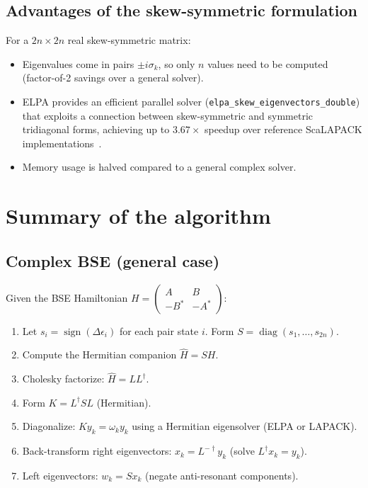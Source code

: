 \documentclass[11pt]{article}
\newcommand{\bmat}[1]{\begin{pmatrix}#1\end{pmatrix}}
\newcommand{\hc}{\dagger}
\newcommand{\Hhat}{\widehat{H}}
\begin{document}
\subsection{Advantages of the skew-symmetric formulation}

For a $2n \times 2n$ real skew-symmetric matrix:
\begin{itemize}
  \item Eigenvalues come in pairs $\pm i\sigma_k$, so only $n$ values
    need to be computed (factor-of-2 savings over a general solver).
  \item ELPA provides an efficient parallel solver
    (\texttt{elpa\_skew\_eigenvectors\_double}) that exploits a
    connection between skew-symmetric and symmetric tridiagonal forms,
    achieving up to $3.67\times$ speedup over reference ScaLAPACK
    implementations~\cite{Penke2020}.
  \item Memory usage is halved compared to a general complex solver.
\end{itemize}


\section{Summary of the algorithm}
\label{sec:algorithm}

\subsection{Complex BSE (general case)}
Given the BSE Hamiltonian $H = \bmat{A & B \\ -B^* & -A^*}$:

\begin{enumerate}
  \item Let $s_i = \operatorname{sign}(\Delta\epsilon_i)$ for each
    pair state $i$.  Form $S = \operatorname{diag}(s_1, \ldots, s_{2n})$.
  \item Compute the Hermitian companion $\Hhat = S H$.
  \item Cholesky factorize: $\Hhat = L L^\hc$.
  \item Form $K = L^\hc S L$ (Hermitian).
  \item Diagonalize: $K y_k = \omega_k y_k$ using a Hermitian
    eigensolver (ELPA or LAPACK).
  \item Back-transform right eigenvectors: $x_k = L^{-\hc} y_k$
    (solve $L^\hc x_k = y_k$).
  \item Left eigenvectors: $w_k = S x_k$ (negate anti-resonant
    components).
\end{enumerate}
\end{document}
